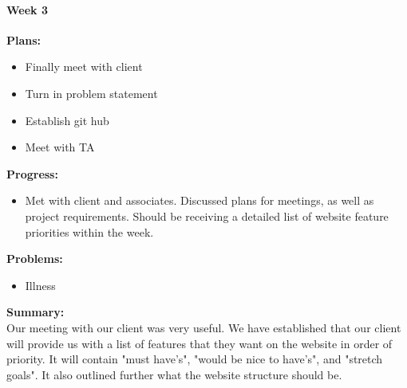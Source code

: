 \paragraph{Week 3}
\begin{adjustwidth}{2.5em}{0pt}
    \vspace{-0.5cm}\textbf{Plans:}
    \vspace{-0.5cm}
    \begin{itemize}
        \item Finally meet with client
        \item Turn in problem statement 
		\item Establish git hub
		\item Meet with TA
    \end{itemize} 
    \vspace{-0.3cm}\textbf{Progress:}
    \vspace{-0.5cm}
    \begin{itemize}
        \item Met with client and associates. Discussed plans for meetings, as well as project requirements. Should be receiving a detailed list of website feature priorities within the week.
		
    \end{itemize} 
    \vspace{-0.3cm}\textbf{Problems:}
    \vspace{-0.5cm}
    \begin{itemize}
        \item Illness
    \end{itemize}  
    \vspace{-0.3cm}\noindent\textbf{Summary:}\\
    \noindent Our meeting with our client was very useful. We have established that our client will provide us with a  list of features that they want on the website in order of priority. It will contain "must have's", "would be nice to have's", and "stretch goals". It also outlined further what the website structure should be.
	\end{adjustwidth} 
